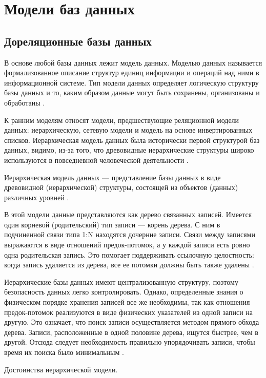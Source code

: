 \documentclass{bmstu}
\begin{document}
\section{Модели баз данных}

\subsection{Дореляционные базы данных}

В основе любой базы данных лежит модель данных. 
Моделью данных называется формализованное описание структур единиц информации и операций над ними в информационной системе. 
Тип модели данных определяет логическую структуру базы данных и то, каким образом данные могут быть сохранены, организованы и обработаны \cite{Avrunev2018}.

К ранним моделям относят модели, предшествующие реляционной
модели данных: иерархическую, сетевую модели и модель на основе инвертированных списков. 
Иерархическая модель данных была исторически первой структурой
баз данных, видимо, из-за того, что древовидные иерархические структуры широко используются в повседневной человеческой деятельности \cite{Avrunev2018}.

Иерархическая модель данных --- представление базы данных в виде древовидной (иерархической) структуры, состоящей из объектов (данных) различных уровней \cite{Avrunev2018}.

В этой модели данные представляются как дерево связанных записей. 
Имеется один корневой (родительский) тип записи --- корень дерева. 
С ним в подчиненной связи типа 1:N находятся дочерние записи. 
Связи между записями выражаются в виде отношений предок-потомок, а у каждой записи есть ровно одна родительская запись. 
Это помогает поддерживать ссылочную целостность: когда запись удаляется из дерева, все ее потомки должны быть также
удалены \cite{Avrunev2018}.

Иерархические базы данных имеют централизованную структуру,
поэтому безопасность данных легко контролировать. 
Однако, определенные знания о физическом порядке хранения записей все же необходимы, так как отношения предок-потомок реализуются в виде физических указателей из одной записи на другую. 
Это означает, что поиск записи осуществляется методом прямого обхода дерева. 
Записи, расположенные в одной половине дерева, ищутся быстрее, чем в другой. 
Отсюда следует необходимость правильно упорядочивать записи, чтобы время их поиска было минимальным \cite{Avrunev2018}.

Достоинства иерархической модели.
\end{document}
